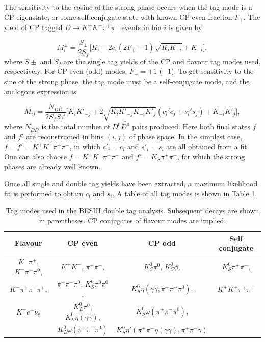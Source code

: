 \documentclass[12pt, a4paper, notitlepage, onecolumn]{article}
\numberwithin{equation}{section}
\begin{document}
The sensitivity to the cosine of the strong phase occurs when the tag mode is a CP eigenstate, or some self-conjugate state with known CP-even fraction $F_+$. The yield of CP tagged $D\to K^+K^-\pi^+\pi^-$ events in bin $i$ is given by

\begin{equation}
  M_i^\pm = \frac{S_\pm}{2S_f}\Big[K_i - 2c_i(2F_+ - 1)\sqrt{K_iK_{-i}} + K_{-i}\Big],
  \label{eq_Mi}
\end{equation}
where $S\pm$ and $S_f$ are the single tag yields of the CP and flavour tag modes used, respectively. For CP even (odd) modes, $F_+ = +1$ ($-1$). To get sensitivity to the sine of the strong phase, the tag mode must be a self-conjugate mode, and the analogous expression is

\begin{equation}
  M_{ij} = \frac{N_{D\bar{D}}}{2S_fS_f'}\Big[K_iK'_{-j} + 2\sqrt{K_iK'_{-j}K_{-i}K'_j}(c_i'c_j + s_i's_j) + K_{-i}K'_j\Big],
  \label{eq_Mij}
\end{equation}
where $N_{D\bar{D}}$ is the total number of $D^0\bar{D^0}$ pairs produced. Here both final states $f$ and $f'$ are reconstructed in bins $(i, j)$ of phase space. In the simplest case, $f = f' = K^+K^-\pi^+\pi^-$, in which $c'_i = c_i$ and $s'_i = s_i$ are all obtained from a fit. One can also choose $f = K^+K^-\pi^+\pi^-$ and $f' = K_S\pi^+\pi^-$, for which the strong phases are already well known.

Once all single and double tag yields have been extracted, a maximum likelihood fit is performed to obtain $c_i$ and $s_i$. A table of all tag modes is shown in Table \ref{table_tag_modes}.

\begin{table}[H]
  \centering
  \caption{Tag modes used in the BESIII double tag analysis. Subsequent decays are shown in parentheses. CP conjugates of flavour modes are implied.}
  \label{table_tag_modes}
  \begin{tabular}{cccc} 
    \toprule
    Flavour & CP even & CP odd & Self conjugate \\
    \midrule
    $K^-\pi^+$, $K^-\pi^+\pi^0$, & $K^+K^-$, $\pi^+\pi^-$,                  & $K_S^0\pi^0$, $K_S^0\phi$,                  & $K_S^0\pi^+\pi^-$, \\
    $K^-\pi^+\pi^-\pi^+$,        & $\pi^+\pi^-\pi^0$, $K_S^0\pi^0\pi^0$,    & $K_S^0\eta(\gamma\gamma, \pi^+\pi^-\pi^0)$, & $K^+K^-\pi^+\pi^-$ \\
    $K^- e^+\nu_e$               & $K_L^0\pi^0$, $K_L^0\eta(\gamma\gamma)$, & $K_S^0\omega(\pi^+\pi^-\pi^0)$,             & \\
                                 & $K_L^0\omega(\pi^+\pi^-\pi^0)$           & $K_S^0\eta'(\pi^+\pi^-\eta(\gamma\gamma), \pi^+\pi^-\gamma)$  & \\
    \bottomrule
  \end{tabular}
\end{table}
\end{document}

